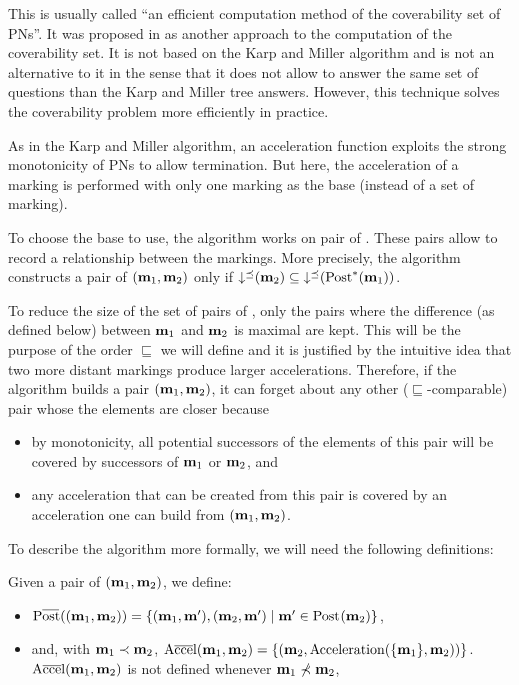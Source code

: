 This is usually called ``an efficient computation method of the coverability set of \acp{PN}''.
It was proposed in \cite{Geeraerts07thesis, Geeraerts07} as another approach to the computation of the coverability set.
It is not based on the Karp and Miller algorithm and is not an alternative to it in the sense that it does not allow to answer the same set of questions than the Karp and Miller tree answers.
However, this technique solves the coverability problem more efficiently in practice.

As in the Karp and Miller algorithm, an acceleration function exploits the strong monotonicity of \acp{PN} to allow termination.
But here, the acceleration of a marking is performed with only one marking as the base (instead of a set of marking).

To choose the base to use, the algorithm works on pair of \omarks.
These pairs allow to record a relationship between the markings.
More precisely, the algorithm constructs a pair of \omarks $(\mathbf{m}_1, \mathbf{m}_2)$ only if $\operatorname{\downarrow^\preceq}(\mathbf{m}_2) \subseteq \operatorname{\downarrow^\preceq}(\operatorname{Post}^*_{{}}(\mathbf{m}_1))$.

To reduce the size of the set of pairs of \omarks, only the pairs where the difference (as defined below) between $\mathbf{m}_1$ and $\mathbf{m}_2$ is maximal are kept.
This will be the purpose of the order $\sqsubseteq$ we will define and it is justified by the intuitive idea that two more distant markings produce larger accelerations.
Therefore, if the algorithm builds a pair $(\mathbf{m}_1, \mathbf{m}_2)$, it can forget about any other ($\sqsubseteq$-comparable) pair whose the elements are closer because
\begin{itemize}
  \item by monotonicity, all potential successors of the elements of this pair will be covered by successors of $\mathbf{m}_1$ or $\mathbf{m}_2$, and
  \item any acceleration that can be created from this pair is covered by an acceleration one can build from $(\mathbf{m}_1, \mathbf{m}_2)$.
\end{itemize}

To describe the algorithm more formally, we will need the following definitions:

Given a pair of \omarks $(\mathbf{m}_1, \mathbf{m}_2)$, we define:
\begin{itemize}
  \item $\Postb((\mar_1, \mar_2)) = \{(\mar_1, \mar'), (\mar_2, \mar') \mid \mar' \in \post{\mar_2}\}$,
  \item and, with $\mathbf{m}_1 \prec \mathbf{m}_2$, $\operatorname{A\overline{cce}l}(\mathbf{m}_1, \mathbf{m}_2) = \{(\mathbf{m}_2, \operatorname{Acceleration}(\{\mathbf{m}_1\}, \mathbf{m}_2))\}$.
    $\operatorname{A\overline{cce}l}(\mathbf{m}_1, \mathbf{m}_2)$ is not defined whenever $\mathbf{m}_1 \nprec \mathbf{m}_2$,
\end{itemize}

